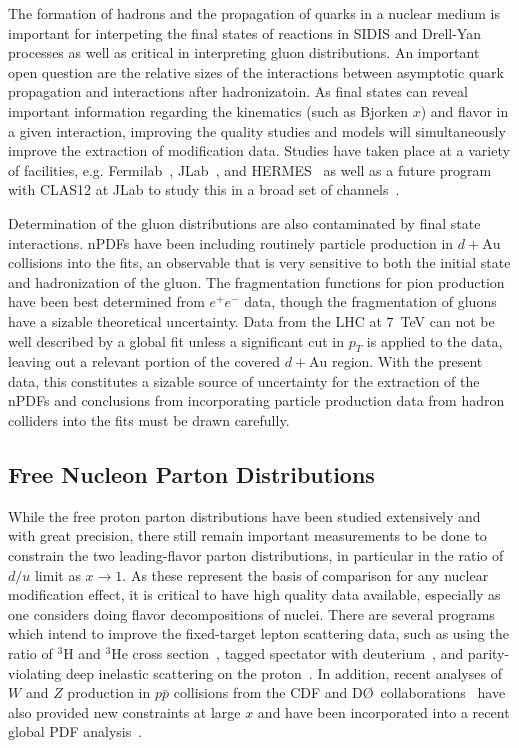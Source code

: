 The formation of hadrons and the propagation of quarks in a nuclear medium is important for interpeting the final states of reactions in SIDIS and Drell-Yan processes as well as critical in interpreting gluon distributions.  An important open question are the relative sizes of the interactions between asymptotic quark propagation and interactions after hadronizatoin.  As final states can reveal important information regarding the kinematics (such as Bjorken $x$) and flavor in a given interaction, improving the quality studies and models will simultaneously improve the extraction of modification data.  Studies have taken place at a variety of facilities, e.g. Fermilab~\cite{PhysRevC.75.035206}, JLab~\cite{PhysRevLett.99.242502, ELFASSI2012326}, and HERMES~\cite{Airapetian2011} as well as a future program with CLAS12 at JLab to study this in a broad set of channels~\cite{quarkformprop}.

Determination of the gluon distributions are also contaminated by final state interactions. nPDFs have been including routinely particle production in $d+\mathrm{Au}$ collisions into the fits, an observable that is very sensitive to both the initial state and hadronization of the gluon. The fragmentation functions for pion production have been best determined from $e^+e^-$ data, though the fragmentation of gluons have a sizable theoretical uncertainty. Data from the LHC at $7$~TeV can not be well described by a global fit unless a significant cut in $p_{T}$ is applied to the data, leaving out a relevant portion of the covered $d+\mathrm{Au}$ region.  With the present data, this constitutes a sizable source of uncertainty for the extraction of the nPDFs and conclusions from incorporating particle production data from hadron colliders into the fits must be drawn carefully.

\subsection{Free Nucleon Parton Distributions}

While the free proton parton distributions have been studied extensively and with great precision, there still remain important measurements to be done to constrain the two leading-flavor parton distributions, in particular in the ratio of $d/u$ limit as $x \rightarrow 1$.  As these represent the basis of comparison for any nuclear modification effect, it is critical to have high quality data available, especially as one considers doing flavor decompositions of nuclei.  There are several programs which intend to improve the fixed-target lepton scattering data, such as using the ratio of ${}^{3}$H and ${}^{3}$He cross section~\cite{mar}, tagged spectator with deuterium~\cite{bonus12}, and parity-violating deep inelastic scattering on the proton~\cite{solid_pvdis}.  In addition, recent analyses of $W$ and $Z$ production in $p\bar{p}$ collisions from the CDF and D\O\ collaborations~\cite{D0:2014kma,Abazov:2013dsa,Acosta:2005ud,Aaltonen:2009ta,Aaltonen:2010zza,Abazov:2007jy} have also provided new constraints at large $x$ and have been incorporated into a recent global PDF analysis~\cite{Accardi:2016qay}.

